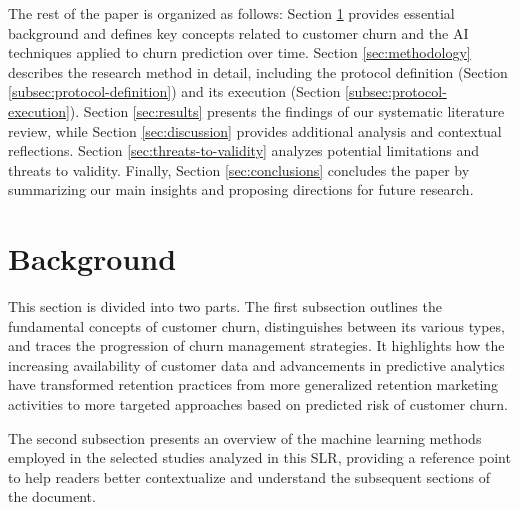 \documentclass[preprint,12pt]{elsarticle}
\newcommand{\DD}[2]{\textcolor{blue}{#1}[\textcolor{red}{#2}]}
\begin{document}
The rest of the paper is organized as follows: Section \ref{sec:background} provides essential background and defines key concepts related to customer churn and the AI techniques applied to churn prediction over time. 
Section \ref{sec:methodology} describes the research method in detail, including the protocol definition (Section \ref{subsec:protocol-definition}) and its execution (Section \ref{subsec:protocol-execution}).
Section \ref{sec:results} presents the findings of our systematic literature review, while Section \ref{sec:discussion} provides additional analysis and contextual reflections. 
Section  \ref{sec:threats-to-validity} analyzes potential limitations and threats to validity.
Finally, Section \ref{sec:conclusions} concludes the paper by summarizing our main insights and proposing directions for future research. 

%

\section{Background}
\label{sec:background}



This section is divided into two parts. The first subsection outlines the fundamental concepts of customer churn, distinguishes between its various types, and traces the progression of churn management strategies. It highlights how the increasing availability of customer data and advancements in predictive analytics have transformed retention practices from more generalized retention marketing activities to more targeted approaches based on predicted risk of customer churn.

The second subsection presents an overview of the machine learning methods employed in the selected studies analyzed in this SLR, providing a reference point to help readers better contextualize and understand the subsequent sections of the document.
 
\end{document}
